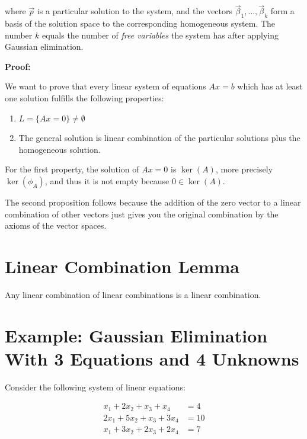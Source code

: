 where \(\vec{p}\) is a particular solution to the system, and the vectors \(\vec{\beta}_1,
\ldots, \vec{\beta}_k\) form a basis of the solution space to the corresponding homogeneous system.
The number \(k\) equals the number of \emph{free variables} the system has after applying Gaussian
elimination.

\textbf{Proof:}

We want to prove that every linear system of equations \(Ax = b\) which has at least one solution fulfills 
the following properties:

\begin{enumerate}

    \item \(L = \{Ax = 0\} \ne \emptyset\)

    \item The general solution is linear combination of the particular solutions plus the homogeneous solution.

\end{enumerate}

For the first property, the solution of \(Ax = 0\) is \(\ker(A)\), more precisely \(\ker(\phi_A)\), and thus 
it is not empty because \(0 \in \ker(A)\).

The second proposition follows because the addition of the zero vector to a linear 
combination of other vectors just gives you the original combination by the axioms of the vector spaces.

\QED 

\section{Linear Combination Lemma}

Any linear combination of linear combinations is a linear combination.

\section{Example: Gaussian Elimination With 3 Equations and 4 Unknowns}

Consider the following system of linear equations:

\begin{align*}
    x_1 + 2x_2 + x_3 + x_4   & = 4  \\
    2x_1 + 5x_2 + x_3 + 3x_4 & = 10 \\
    x_1 + 3x_2 + 2x_3 + 2x_4 & = 7
\end{align*}

